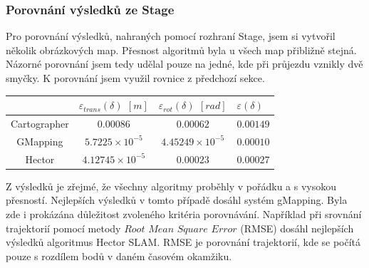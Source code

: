 \documentclass[12pt]{article}
\begin{document}
\subsubsection{Porovnání výsledků ze Stage}
Pro porovnání výsledků, nahraných pomocí rozhraní Stage, jsem si vytvořil několik obrázkových map. Přesnost algoritmů byla u všech map přibližně stejná. Názorné porovnání jsem tedy udělal pouze na jedné, kde při průjezdu vznikly dvě smyčky. K porovnání jsem využil rovnice z předchozí sekce.\\
\begin{center}
	\begin{tabular}{c|ccp{3cm}}
		\bfseries \bfseries  & $\varepsilon_{trans}(\delta)$ $[m]$ & $\varepsilon_{rot}(\delta)$ $[rad]$ & $\varepsilon(\delta)$  \\ [2mm]
		\hline
		Cartographer & $0.00086$ & $0.00062$ & $0.00149$  \\
		GMapping & $5.7225\times10^{-5}$ & $4.45249\times10^{-5}$ & $0.00010$  \\ 
		Hector & $4.12745\times10^{-5}$ & $0.00023$ & $0.00027$  \\ 
	\end{tabular}
\end{center}

Z výsledků je zřejmé, že všechny algoritmy proběhly v pořádku a s vysokou přesností. Nejlepších výsledků v tomto případě dosáhl systém gMapping. Byla zde i prokázána důležitost zvoleného kritéria porovnávání. Například při srovnání trajektorií pomocí metody $Root$ $Mean$ $Square$ $Error$ (RMSE) dosáhl nejlepších výsledků algoritmus Hector SLAM. RMSE je porovnání trajektorií, kde se počítá pouze s rozdílem bodů v daném časovém okamžiku. 

\newpage
\end{document}
